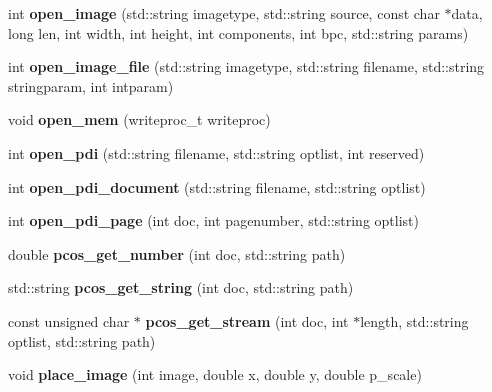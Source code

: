 \begin{DoxyCompactItemize}
\item 
\hypertarget{classPDFlib_aaf45ace35fe6f1b149f4f8d729dbd612}{}\label{classPDFlib_aaf45ace35fe6f1b149f4f8d729dbd612} 
int {\bfseries open\+\_\+image} (std\+::string imagetype, std\+::string source, const char $\ast$data, long len, int width, int height, int components, int bpc, std\+::string params)
\item 
\hypertarget{classPDFlib_a11741eafa900b4490097cb913709b984}{}\label{classPDFlib_a11741eafa900b4490097cb913709b984} 
int {\bfseries open\+\_\+image\+\_\+file} (std\+::string imagetype, std\+::string filename, std\+::string stringparam, int intparam)
\item 
\hypertarget{classPDFlib_a2ec7cc181d64f7baa8d08e74f2824ab8}{}\label{classPDFlib_a2ec7cc181d64f7baa8d08e74f2824ab8} 
void {\bfseries open\+\_\+mem} (writeproc\+\_\+t writeproc)
\item 
\hypertarget{classPDFlib_a13d36d30ea9a98394589977fe877ae47}{}\label{classPDFlib_a13d36d30ea9a98394589977fe877ae47} 
int {\bfseries open\+\_\+pdi} (std\+::string filename, std\+::string optlist, int reserved)
\item 
\hypertarget{classPDFlib_a0d18c17852e877905ab0310ecf1e0b37}{}\label{classPDFlib_a0d18c17852e877905ab0310ecf1e0b37} 
int {\bfseries open\+\_\+pdi\+\_\+document} (std\+::string filename, std\+::string optlist)
\item 
\hypertarget{classPDFlib_ae1e065f5dcb8e50aad847deca22b8841}{}\label{classPDFlib_ae1e065f5dcb8e50aad847deca22b8841} 
int {\bfseries open\+\_\+pdi\+\_\+page} (int doc, int pagenumber, std\+::string optlist)
\item 
\hypertarget{classPDFlib_a639288411ee0b9e98ffbdb34434f05ed}{}\label{classPDFlib_a639288411ee0b9e98ffbdb34434f05ed} 
double {\bfseries pcos\+\_\+get\+\_\+number} (int doc, std\+::string path)
\item 
\hypertarget{classPDFlib_a3646a04ca4ada3420add8ee98a39dade}{}\label{classPDFlib_a3646a04ca4ada3420add8ee98a39dade} 
std\+::string {\bfseries pcos\+\_\+get\+\_\+string} (int doc, std\+::string path)
\item 
\hypertarget{classPDFlib_ab6dfb9502a37bf9312cf0431ca297819}{}\label{classPDFlib_ab6dfb9502a37bf9312cf0431ca297819} 
const unsigned char $\ast$ {\bfseries pcos\+\_\+get\+\_\+stream} (int doc, int $\ast$length, std\+::string optlist, std\+::string path)
\item 
\hypertarget{classPDFlib_a17390ec77d9d1b476870cf72fce905aa}{}\label{classPDFlib_a17390ec77d9d1b476870cf72fce905aa} 
void {\bfseries place\+\_\+image} (int image, double x, double y, double p\+\_\+scale)

\end{DoxyCompactItemize}
